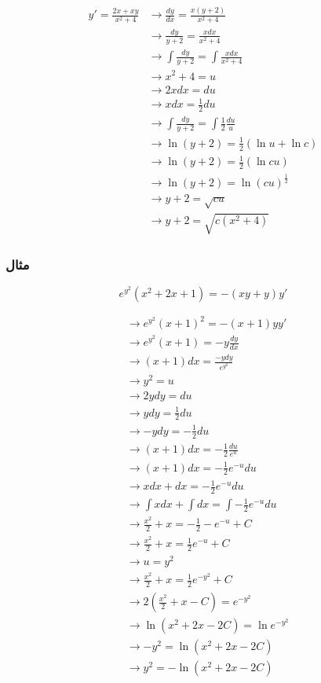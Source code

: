 \documentclass[12pt]{book}
\begin{document}
\begin{align*}
y' = \frac{2x + xy}{x^{2}+4} &\to \frac{dy}{dx} = \frac{x(y+2)}{x^{2}+4} \\
&\to \frac{dy}{y+2} = \frac{xdx}{x^{2}+4} \\
&\to \int{\frac{dy}{y+2}} = \int{\frac{xdx}{x^{2}+4}} \\
&\to x^{2} + 4 = u \\
&\to 2xdx = du \\
&\to xdx = \frac{1}{2} du \\
&\to \int{\frac{dy}{y+2}} = \int{\frac{1}{2} \frac{du}{u} } \\
&\to \ln{(y+2)} = \frac{1}{2} \left( \ln{u} + \ln{c} \right) \\
&\to \ln{(y+2)} = \frac{1}{2} \left( \ln{cu} \right) \\
&\to \ln{(y+2)} = \ln{(cu)^{\frac{1}{2}}} \\
&\to y+2 = \sqrt{cu} \\
&\to y + 2 = \sqrt{c(x^{2}+4)}
\end{align*}



\subsubsection{مثال}

$$
e^{y^{2}} ( x^{2} + 2x + 1 ) = - ( xy + y ) y' 
$$


\begin{align*}
&\to e^{y^{2}} ( x + 1 )^{2} = - (x+1) yy' \\
&\to e^{y^{2}} (x + 1) = - y \frac{dy}{dx} \\
&\to (x+1)dx = \frac{-ydy}{e^{y^{2}}} \\
&\to y^{2} = u \\
&\to 2ydy = du \\
&\to ydy = \frac{1}{2} du \\
&\to - ydy = - \frac{1}{2} du \\
&\to (x+1)dx = - \frac{1}{2} \frac{du}{e^{u} } \\
&\to (x+1)dx = - \frac{1}{2} e^{-u} du \\
&\to xdx + dx = - \frac{1}{2} e^{-u} du \\
&\to \int{xdx} + \int{dx} = \int{- \frac{1}{2} e^{-u} du} \\
&\to \frac{x^{2}}{2} + x = - \frac{1}{2} - e^{-u} + C \\
&\to \frac{x^{2}}{2} + x =  \frac{1}{2}  e^{-u} + C \\
&\to u = y^{2} \\
&\to \frac{x^{2}}{2} + x =  \frac{1}{2}  e^{- y^{2}} + C \\
&\to 2 \left( \frac{x^{2}}{2} + x - C \right) =  e^{- y^{2}} \\
&\to \ln{(x^{2} + 2x - 2C)} = \ln{e^{- y^{2}}} \\
&\to - y^{2} = \ln{(x^{2} + 2x - 2C)} \\
&\to y^{2} = - \ln{(x^{2} + 2x - 2C)}
\end{align*}
\end{document}
